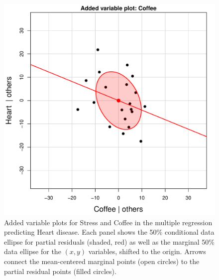 \begin{figure}[htb]
\begin{minipage}[b]{.49\linewidth}
  \includegraphics[width=1\linewidth]{fig/coffee-avplot2}
 \end{minipage}
  \caption{Added variable plots for Stress and Coffee in the multiple regression predicting Heart disease.
Each panel shows the 50\% conditional data ellipse for partial residuals (shaded, red) as well as the marginal 50\% 
data ellipse for the $(x, y)$ variables, shifted to the origin.
Arrows connect the mean-centered marginal points (open circles) to the partial residual points (filled circles).}
  \label{fig:coffee-avplot}
\end{figure}
